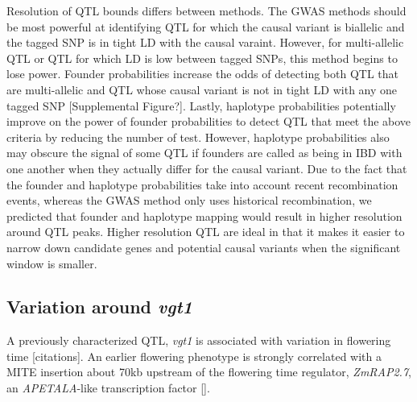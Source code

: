 \documentclass[article,9pt,twocolumn,twoside]{rilabRxiv}
\begin{document}
Resolution of QTL bounds differs between methods.
The GWAS methods should be most powerful at identifying QTL
for which the causal variant is biallelic and the tagged SNP is in tight LD with
the causal varaint. However, for multi-allelic QTL or QTL for which LD is low
between tagged SNPs, this method begins to lose power. Founder probabilities increase
the odds of detecting both QTL that are multi-allelic and QTL whose causal variant
is not in tight LD with any one tagged SNP [Supplemental Figure?]. Lastly,
haplotype probabilities potentially improve on the power of founder probabilities
to detect QTL that meet the above criteria by reducing the number of test. However,
haplotype probabilities also may obscure the signal of some QTL if founders are
called as being in IBD with one another when they actually differ for the causal
variant. Due to the fact that the founder and haplotype probabilities
take into account recent recombination events, whereas the GWAS method only uses
historical recombination, we predicted that founder and haplotype mapping would
result in higher resolution around QTL peaks. Higher resolution QTL are ideal in
that it makes it easier to narrow down candidate genes and potential causal variants
when the significant window is smaller.


\subsection{Variation around \emph{vgt1}}
A previously characterized QTL, \emph{vgt1} is associated with variation in flowering time [citations]. An earlier flowering phenotype is strongly correlated with a MITE insertion about 70kb upstream of the flowering time regulator, \emph{ZmRAP2.7}, an \emph{APETALA}-like transcription factor [].
\end{document}

